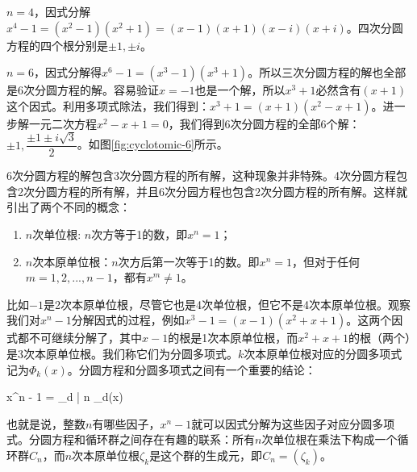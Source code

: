 \documentclass[b5paper]{ctexart}
\begin{document}
\begin{center}
\end{center}

$n = 4$，因式分解$x^4 - 1 = (x^2 - 1)(x^2 + 1) = (x - 1)(x + 1)(x - i)(x + i)$。四次分圆方程的四个根分别是$\pm 1, \pm i$。



$n = 6$，因式分解得$x^6 - 1 = (x^3 - 1)(x^3 + 1)$。所以三次分圆方程的解也全部是6次分圆方程的解。容易验证$x = -1$也是一个解，所以$x^3 + 1$必然含有$(x + 1)$这个因式。利用多项式除法，我们得到：$x^3 + 1 = (x + 1)(x^2 - x + 1)$。进一步解一元二次方程$x^2 - x + 1 = 0$，我们得到6次分圆方程的全部6个解：$\pm 1, \dfrac{\pm 1 \pm i \sqrt{3}}{2}$。如图\ref{fig:cyclotomic-6}所示。


6次分圆方程的解包含3次分圆方程的所有解，这种现象并非特殊。4次分圆方程包含2次分圆方程的所有解，并且6次分园方程也包含2次分圆方程的所有解。这样就引出了两个不同的概念：

\begin{enumerate}
\item $n$次单位根: $n$次方等于1的数，即$x^n = 1$；
\item $n$次本原单位根：$n$次方后第一次等于1的数。即$x^n = 1$，但对于任何$m = 1, 2, ..., n - 1$，都有$x^m \neq 1$。
\end{enumerate}

比如$-1$是2次本原单位根，尽管它也是4次单位根，但它不是4次本原单位根。观察我们对$x^n - 1$分解因式的过程，例如$x^3 - 1 = (x - 1)(x^2 + x + 1)$。这两个因式都不可继续分解了，其中$x - 1$的根是1次本原单位根，而$x^2 + x + 1$的根（两个）是3次本原单位根。我们称它们为分圆多项式。$k$次本原单位根对应的分圆多项式记为$\Phi_k(x)$。分圆方程和分圆多项式之间有一个重要的结论：

\be
x^n - 1 = \displaystyle \prod_{d | n} \Phi_d(x)
\ee

也就是说，整数$n$有哪些因子，$x^n - 1$就可以因式分解为这些因子对应分圆多项式。分圆方程和循环群之间存在有趣的联系：所有$n$次单位根在乘法下构成一个循环群$C_n$，而$n$次本原单位根$\zeta_k$是这个群的生成元，即$C_n = (\zeta_k)$。
\end{document}
